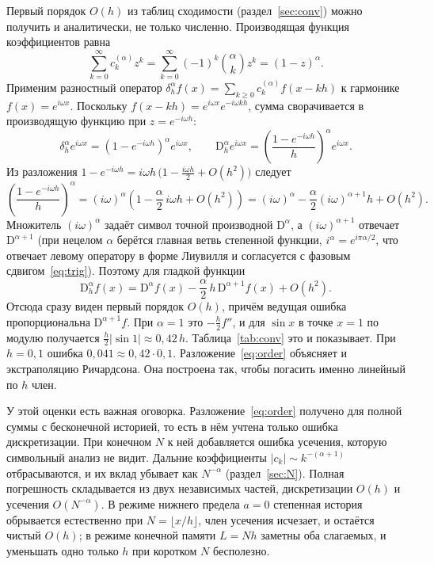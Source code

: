 \documentclass[14pt,a4paper]{extarticle}
\newcommand{\D}{\mathrm{D}}
\begin{document}
Первый порядок $O(h)$ из таблиц сходимости (раздел~\ref{sec:conv}) можно получить и аналитически, не только численно. Производящая функция коэффициентов равна
\begin{equation}
\sum_{k=0}^{\infty}c_k^{(\alpha)}z^k=\sum_{k=0}^{\infty}(-1)^k\binom{\alpha}{k}z^k=(1-z)^{\alpha}.
\end{equation}
Применим разностный оператор $\delta_h^{\alpha}f(x)=\sum_{k\geqslant0}c_k^{(\alpha)}f(x-kh)$ к гармонике $f(x)=e^{i\omega x}$. Поскольку $f(x-kh)=e^{i\omega x}e^{-i\omega kh}$, сумма сворачивается в производящую функцию при $z=e^{-i\omega h}$:
\begin{equation}
\delta_h^{\alpha}e^{i\omega x}=(1-e^{-i\omega h})^{\alpha}e^{i\omega x},\qquad
\D^{\alpha}_{h}e^{i\omega x}=\left(\frac{1-e^{-i\omega h}}{h}\right)^{\alpha}e^{i\omega x}.
\end{equation}
Из разложения $1-e^{-i\omega h}=i\omega h\,\bigl(1-\tfrac{i\omega h}{2}+O(h^2)\bigr)$ следует
\begin{equation}
\left(\frac{1-e^{-i\omega h}}{h}\right)^{\alpha}=(i\omega)^{\alpha}\left(1-\frac{\alpha}{2}\,i\omega h+O(h^2)\right)=(i\omega)^{\alpha}-\frac{\alpha}{2}(i\omega)^{\alpha+1}h+O(h^2).
\end{equation}
Множитель $(i\omega)^{\alpha}$ задаёт символ точной производной $\D^{\alpha}$, а $(i\omega)^{\alpha+1}$ отвечает $\D^{\alpha+1}$ (при нецелом $\alpha$ берётся главная ветвь степенной функции, $i^{\alpha}=e^{i\pi\alpha/2}$, что отвечает левому оператору в форме Лиувилля и согласуется с фазовым сдвигом~\eqref{eq:trig}). Поэтому для гладкой функции
\begin{equation}
\D^{\alpha}_{h}f(x)=\D^{\alpha}f(x)-\frac{\alpha}{2}\,h\,\D^{\alpha+1}f(x)+O(h^2).
\label{eq:order}
\end{equation}
Отсюда сразу виден первый порядок $O(h)$, причём ведущая ошибка пропорциональна $\D^{\alpha+1}f$. При $\alpha=1$ это $-\tfrac{h}{2}f''$, и для $\sin x$ в точке $x=1$ по модулю получается $\tfrac{h}{2}|\!\sin1|\approx0{,}42\,h$. Таблица~\ref{tab:conv} это и показывает. При $h=0{,}1$ ошибка $0{,}041\approx0{,}42\cdot0{,}1$. Разложение~\eqref{eq:order} объясняет и экстраполяцию Ричардсона. Она построена так, чтобы погасить именно линейный по $h$ член.

У этой оценки есть важная оговорка. Разложение~\eqref{eq:order} получено для полной суммы с бесконечной историей, то есть в нём учтена только ошибка дискретизации. При конечном $N$ к ней добавляется ошибка усечения, которую символьный анализ не видит. Дальние коэффициенты $|c_k|\sim k^{-(\alpha+1)}$ отбрасываются, и их вклад убывает как $N^{-\alpha}$ (раздел~\ref{sec:N}). Полная погрешность складывается из двух независимых частей, дискретизации $O(h)$ и усечения $O(N^{-\alpha})$. В режиме нижнего предела $a=0$ степенная история обрывается естественно при $N=\lfloor x/h\rfloor$, член усечения исчезает, и остаётся чистый $O(h)$; в режиме конечной памяти $L=Nh$ заметны оба слагаемых, и уменьшать одно только $h$ при коротком $N$ бесполезно.
\end{document}

